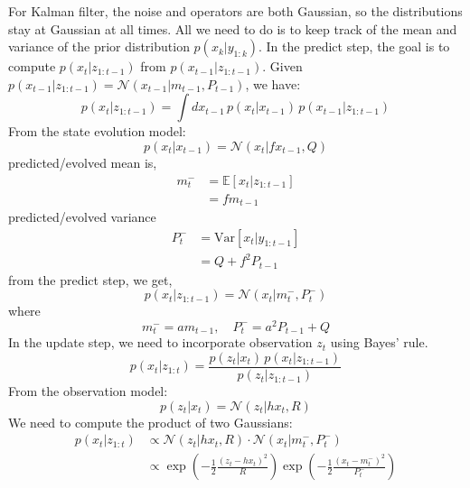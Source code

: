 \documentclass{article}
\begin{document}
For Kalman filter, the noise and operators are both Gaussian, so the distributions stay at Gaussian at all times. All we need to do is to keep track of the mean and variance of the prior distribution $p(x_k | y_{1:k})$. In the predict step, the goal is to compute $p(x_t | z_{1:t-1})$ from $p(x_{t-1} | z_{1:t-1})$.
Given $p(x_{t-1} | z_{1:t-1}) = \mathcal{N}(x_{t-1} | m_{t-1}, P_{t-1})$, we have:
\begin{equation}
p(x_t | z_{1:t-1}) = \int dx_{t-1} \, p(x_t | x_{t-1}) \, p(x_{t-1} | z_{1:t-1})
\end{equation}
From the state evolution model:
\begin{equation}
p(x_t | x_{t-1}) = \mathcal{N}(x_t | f x_{t-1}, Q)
\end{equation}
predicted/evolved mean is,
\begin{align}
m_t^- &= \mathbb{E}[x_t | z_{1:t-1}] \\
&= f m_{t-1}
\end{align}
predicted/evolved variance
\begin{align}
P_t^- &= \text{Var}[x_t | y_{1:t-1}] \\
&= Q + f^2 P_{t-1}
\end{align}
from the predict step, we get,
\begin{equation}
p(x_t | z_{1:t-1}) = \mathcal{N}(x_t | m_t^-, P_t^-)
\end{equation}
where
\begin{equation}
\boxed{m_t^- = a m_{t-1}, \quad P_t^- = a^2 P_{t-1} + Q}
\end{equation}
In the update step, we need to incorporate observation $z_t$ using Bayes' rule.
\begin{equation}
p(x_t | z_{1:t}) = \frac{p(z_t | x_t) \, p(x_t | z_{1:t-1})}{p(z_t | z_{1:t-1})}
\end{equation}
From the observation model:
\begin{equation}
p(z_t | x_t) = \mathcal{N}(z_t | h x_t, R)
\end{equation}
We need to compute the product of two Gaussians:
\begin{align}
p(x_t | z_{1:t}) &\propto \mathcal{N}(z_t | h x_t, R) \cdot \mathcal{N}(x_t | m_t^-, P_t^-) \\
&\propto \exp\left(-\frac{1}{2}\frac{(z_t - h x_t)^2}{R}\right) \exp\left(-\frac{1}{2}\frac{(x_t - m_t^-)^2}{P_t^-}\right)
\end{align}
\end{document}
